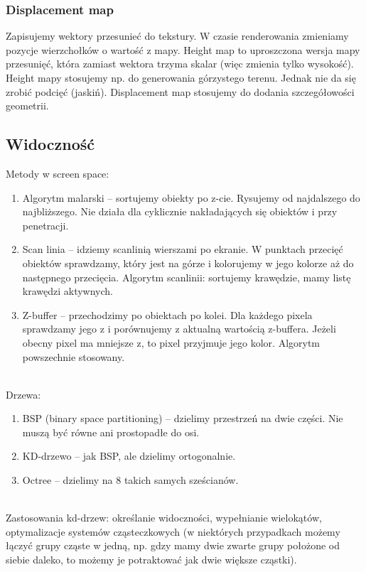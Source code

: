 \documentclass[12pt]{article}
\begin{document}
\subsubsection{Displacement map}
Zapisujemy wektory przesunieć do tekstury. W czasie renderowania zmieniamy pozycje wierzchołków o wartość z mapy. Height map to uproszczona wersja mapy przesunięć, która zamiast wektora trzyma skalar (więc zmienia tylko wysokość). Height mapy stosujemy np. do generowania górzystego terenu. Jednak nie da się zrobić podcięć (jaskiń). Displacement map stosujemy do dodania szczegółowości geometrii. 


\subsection{Widoczność}
Metody w screen space:
\begin{enumerate}
	\item Algorytm malarski -- sortujemy obiekty po z-cie. Rysujemy od najdalszego do najbliższego. Nie działa dla cyklicznie nakładających się obiektów i przy penetracji.
	\item Scan linia -- idziemy scanlinią wierszami po ekranie. W punktach przecięć obiektów sprawdzamy, który jest na górze i kolorujemy w jego kolorze aż do następnego przecięcia. Algorytm scanlinii: sortujemy krawędzie, mamy listę krawędzi aktywnych.
	\item Z-buffer -- przechodzimy po obiektach po kolei. Dla każdego pixela sprawdzamy jego z i porównujemy z aktualną wartością z-buffera. Jeżeli obecny pixel ma mniejsze z, to pixel przyjmuje jego kolor. Algorytm powszechnie stosowany.
\end{enumerate}
~\\
Drzewa:
\begin{enumerate}
	\item BSP (binary space partitioning) -- dzielimy przestrzeń na dwie części. Nie muszą być równe ani prostopadłe do osi.
	\item KD-drzewo -- jak BSP, ale dzielimy ortogonalnie.
	\item Octree -- dzielimy na 8 takich samych sześcianów.
\end{enumerate}
~\\
Zastosowania kd-drzew: określanie widoczności, wypełnianie wielokątów, optymalizacje systemów cząsteczkowych (w niektórych przypadkach możemy łączyć grupy cząste w jedną, np. gdzy mamy dwie zwarte grupy położone od siebie daleko, to możemy je potraktować jak dwie większe cząstki).
\end{document}
